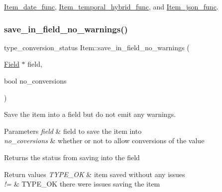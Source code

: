 \mbox{\hyperlink{classItem__date__func_a4fe0277927df0b5012658ebc76717f17}{Item\+\_\+date\+\_\+func}}, \mbox{\hyperlink{classItem__temporal__hybrid__func_a3f3134574bdb6dd08a1cdd7078806368}{Item\+\_\+temporal\+\_\+hybrid\+\_\+func}}, and \mbox{\hyperlink{classItem__json__func_ac8bf3b1104bbbe70d1ec9f4f2bc13fb4}{Item\+\_\+json\+\_\+func}}.

\mbox{\label{classItem_a965258368f10f5b882a532602d328baa}} 
\subsubsection{\texorpdfstring{save\+\_\+in\+\_\+field\+\_\+no\+\_\+warnings()}{save\_in\_field\_no\_warnings()}}
{\footnotesize\ttfamily type\+\_\+conversion\+\_\+status Item\+::save\+\_\+in\+\_\+field\+\_\+no\+\_\+warnings (\begin{DoxyParamCaption}\item[{\mbox{\hyperlink{classField}{Field}} $\ast$}]{field,  }\item[{bool}]{no\+\_\+conversions }\end{DoxyParamCaption})}

Save the item into a field but do not emit any warnings.


\begin{DoxyParams}{Parameters}
{\em field} & field to save the item into \\
\hline
{\em no\+\_\+coversions} & whether or not to allow conversions of the value\\
\hline
\end{DoxyParams}
\begin{DoxyReturn}{Returns}
the status from saving into the field 
\end{DoxyReturn}

\begin{DoxyRetVals}{Return values}
{\em T\+Y\+P\+E\+\_\+\+OK} & item saved without any issues \\
\hline
{\em !=} & T\+Y\+P\+E\+\_\+\+OK there were issues saving the item \\
\hline
\end{DoxyRetVals}
\mbox{\label{classItem_a7d1b934e9612e1c78bd369b31e3d9cb1}} 
